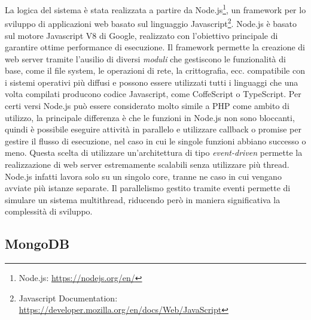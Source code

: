 La logica del sistema è stata realizzata a partire da Node.js\footnote{Node.js: \url{https://nodejs.org/en/}}, un framework per lo sviluppo di applicazioni web basato sul linguaggio Javascript\footnote{Javascript Documentation: \url{https://developer.mozilla.org/en/docs/Web/JavaScript}}. Node.js è basato sul motore Javascript V8 di Google, realizzato con l'obiettivo principale di garantire ottime performance di esecuzione. Il framework permette la creazione di web server tramite l'ausilio di diversi \emph{moduli} che gestiscono le funzionalità di base, come il file system, le operazioni di rete, la crittografia, ecc. \upe compatibile con i sistemi operativi più diffusi e possono essere utilizzati tutti i linguaggi che una volta compilati producono codice Javascript, come CoffeScript o TypeScript. Per certi versi Node.js può essere considerato molto simile a PHP come ambito di utilizzo, la principale differenza è che le funzioni in Node.js non sono bloccanti, quindi è possibile eseguire attività in parallelo e utilizzare callback o promise per gestire il flusso di esecuzione, nel caso in cui le singole funzioni abbiano successo o meno. Questa scelta di utilizzare un'architettura di tipo \emph{event-driven} permette la realizzazione di web server estremamente scalabili senza utilizzare più thread. Node.js infatti lavora solo su un singolo core, tranne ne caso in cui vengano avviate più istanze separate. Il parallelismo gestito tramite eventi permette di simulare un sistema multithread, riducendo però in maniera significativa la complessità di sviluppo.

\subsection{MongoDB}

